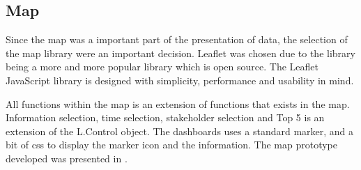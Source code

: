 \subsection{Map} %
\label{sub:map}
Since the map was a important part of the presentation of data, the selection
of the map library were an important decision. Leaflet\cite{leaflet} was 
chosen due to the library being a more and more popular library which is open 
source. The Leaflet JavaScript library is designed with simplicity, 
performance and usability in mind.

All functions within the map is an extension of functions that exists in the
map. Information selection, time selection, stakeholder selection and Top 5 is
an extension of the L.Control object. The dashboards uses a standard marker,
and a bit of css to display the marker icon and the information. The map
prototype developed was presented in .


